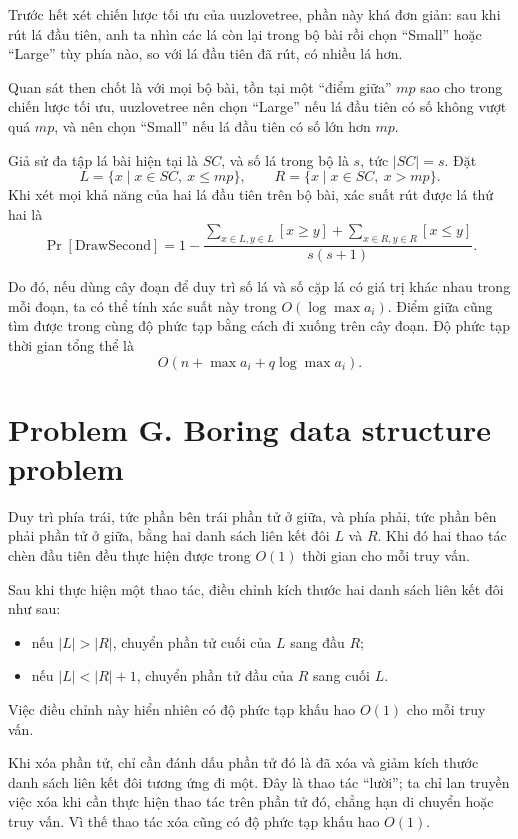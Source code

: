 \documentclass[11pt]{article}
\begin{document}
Trước hết xét chiến lược tối ưu của uuzlovetree, phần này khá đơn giản: sau
khi rút lá đầu tiên, anh ta nhìn các lá còn lại trong bộ bài rồi chọn
``Small'' hoặc ``Large'' tùy phía nào, so với lá đầu tiên đã rút, có nhiều lá
hơn.

Quan sát then chốt là với mọi bộ bài, tồn tại một ``điểm giữa'' $\mathit{mp}$
sao cho trong chiến lược tối ưu, uuzlovetree nên chọn ``Large'' nếu lá đầu
tiên có số không vượt quá $\mathit{mp}$, và nên chọn ``Small'' nếu lá đầu
tiên có số lớn hơn $\mathit{mp}$.

Giả sử đa tập lá bài hiện tại là $SC$, và số lá trong bộ là $s$, tức
$|SC|=s$. Đặt
\[
  L=\{x\mid x\in SC,\ x\le \mathit{mp}\},\qquad
  R=\{x\mid x\in SC,\ x>\mathit{mp}\}.
\]
Khi xét mọi khả năng của hai lá đầu tiên trên bộ bài, xác suất rút được lá
thứ hai là
\[
  \Pr[\mathrm{DrawSecond}]
  =1-\frac{
    \sum_{x\in L,y\in L}[x\ge y]
    +\sum_{x\in R,y\in R}[x\le y]
  }{s(s+1)}.
\]

Do đó, nếu dùng cây đoạn để duy trì số lá và số cặp lá có giá trị khác nhau
trong mỗi đoạn, ta có thể tính xác suất này trong $O(\log\max a_i)$. Điểm
giữa cũng tìm được trong cùng độ phức tạp bằng cách đi xuống trên cây đoạn.
Độ phức tạp thời gian tổng thể là
\[
  O(n+\max a_i+q\log\max a_i).
\]

\section{Problem G. Boring data structure problem}

Duy trì phía trái, tức phần bên trái phần tử ở giữa, và phía phải, tức phần
bên phải phần tử ở giữa, bằng hai danh sách liên kết đôi $L$ và $R$. Khi đó
hai thao tác chèn đầu tiên đều thực hiện được trong $O(1)$ thời gian cho mỗi
truy vấn.

Sau khi thực hiện một thao tác, điều chỉnh kích thước hai danh sách liên kết
đôi như sau:
\begin{itemize}
  \item nếu $|L|>|R|$, chuyển phần tử cuối của $L$ sang đầu $R$;
  \item nếu $|L|<|R|+1$, chuyển phần tử đầu của $R$ sang cuối $L$.
\end{itemize}
Việc điều chỉnh này hiển nhiên có độ phức tạp khấu hao $O(1)$ cho mỗi truy
vấn.

Khi xóa phần tử, chỉ cần đánh dấu phần tử đó là đã xóa và giảm kích thước
danh sách liên kết đôi tương ứng đi một. Đây là thao tác ``lười''; ta chỉ lan
truyền việc xóa khi cần thực hiện thao tác trên phần tử đó, chẳng hạn di
chuyển hoặc truy vấn. Vì thế thao tác xóa cũng có độ phức tạp khấu hao
$O(1)$.
\end{document}
